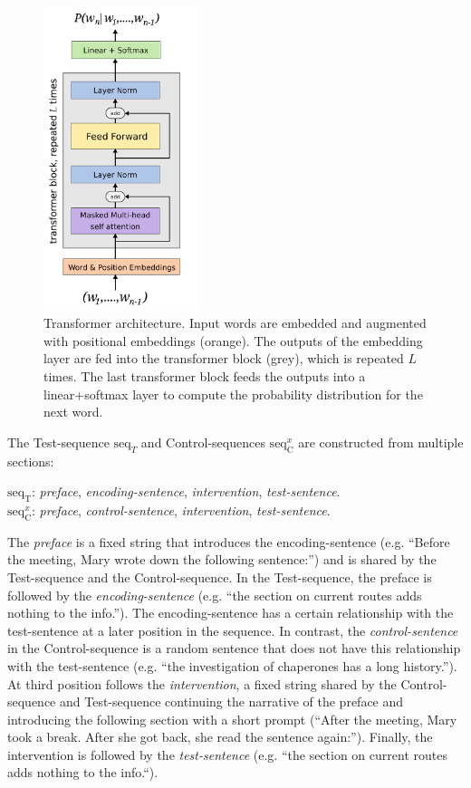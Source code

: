 \begin{figure}
    \centering
    \includegraphics[width=0.4\textwidth]{methods/transformer_block.pdf}
    \caption{Transformer architecture. Input words are embedded and augmented with positional embeddings (orange). The outputs of the embedding layer are fed into the transformer block (grey), which is repeated $L$ times. The last transformer block feeds the outputs into a linear+softmax layer to compute the probability distribution for the next word.}
    \label{fig:transformer_block}
\end{figure}

The Test-sequence $\text{seq}_T$ and Control-sequences $\text{seq}_{\text{C}}^x$ are constructed from multiple sections:
\begin{center}
    $\text{seq}_{\text{T}}$: \textit{preface}, \textit{encoding-sentence}, \textit{intervention}, \textit{test-sentence}.\\
    $\text{seq}_{\text{C}}^x$: \textit{preface}, \textit{control-sentence}, \textit{intervention}, \textit{test-sentence}.\\
\end{center}
The \textit{preface} is a fixed string that introduces the encoding-sentence (e.g. ``Before the meeting, Mary wrote down the following sentence:'') and is shared by the Test-sequence and the Control-sequence.
In the Test-sequence, the preface is followed by the \textit{encoding-sentence} (e.g. ``the section on current routes adds nothing to the info.'').
The encoding-sentence has a certain relationship with the test-sentence at a later position in the sequence.
In contrast, the \textit{control-sentence} in the Control-sequence is a random sentence that does not have this relationship with the test-sentence (e.g. ``the investigation of chaperones has a long history.'').
At third position follows the \textit{intervention}, a fixed string shared by the Control-sequence and Test-sequence continuing the narrative of the preface and introducing the following section with a short prompt (“After the meeting, Mary took a break. After she got back, she read the sentence again:”).
Finally, the intervention is followed by the \textit{test-sentence} (e.g. “the section on current routes adds nothing to the info.“).

